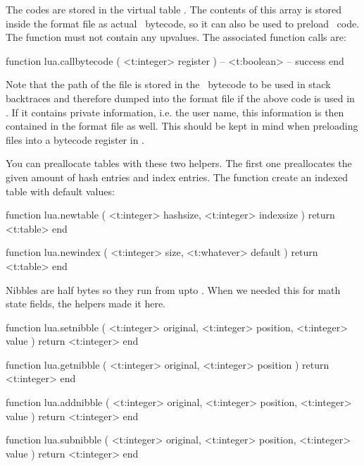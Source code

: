 The codes are stored in the virtual table . The contents of
this array is stored inside the format file as actual \LUA\ bytecode, so it can
also be used to preload \LUA\ code. The function must not contain any upvalues.
The associated function calls are:

\starttyping[option=LUA]
function lua.callbytecode ( <t:integer> register )
    -- <t:boolean> -- success
end
\stoptyping

Note that the path of the file is stored in the \LUA\ bytecode to be used in
stack backtraces and therefore dumped into the format file if the above code is
used in \INITEX. If it contains private information, i.e. the user name, this
information is then contained in the format file as well. This should be kept in
mind when preloading files into a bytecode register in \INITEX.

\stopsubsection

\startsubsection[title=Tables]

You can preallocate tables with these two helpers. The first one preallocates the
given amount of hash entries and index entries. The  function
create an indexed table with default values:

\starttyping[option=LUA]
function lua.newtable ( <t:integer> hashsize, <t:integer> indexsize )
    return <t:table>
end

function lua.newindex ( <t:integer> size, <t:whatever> default )
    return <t:table>
end
\stoptyping

\stopsubsection

\startsubsection[title=Nibbles]

Nibbles are half bytes so they run from  upto . When we
needed this for math state fields, the helpers made it here.

\starttyping[option=LUA]
function lua.setnibble ( <t:integer> original, <t:integer> position, <t:integer> value )
    return <t:integer>
end
\stoptyping

\starttyping[option=LUA]
function lua.getnibble ( <t:integer> original, <t:integer> position )
    return <t:integer>
end
\stoptyping

\starttyping[option=LUA]
function lua.addnibble ( <t:integer> original, <t:integer> position, <t:integer> value )
    return <t:integer>
end
\stoptyping

\starttyping[option=LUA]
function lua.subnibble ( <t:integer> original, <t:integer> position, <t:integer> value )
    return <t:integer>
end
\stoptyping

